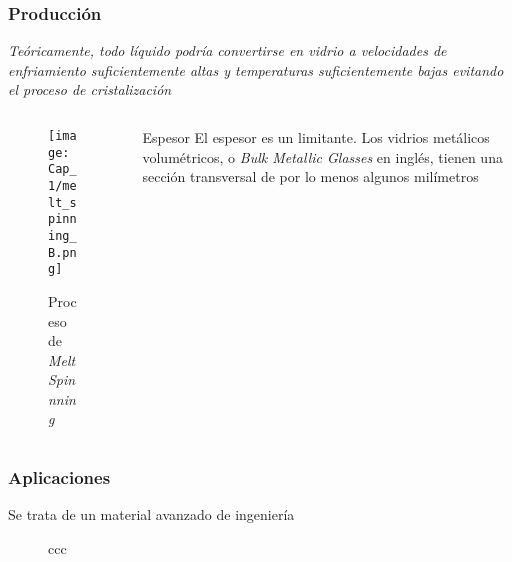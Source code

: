 \begin{frame}
 \frametitle{Producci\'on}
 
 \begin{block}{}
    \textit{Te\'oricamente, todo l\'iquido podr\'ia convertirse en vidrio a velocidades de enfriamiento suficientemente altas y temperaturas suficientemente bajas evitando el proceso de cristalizaci\'on} \cite{turnbull61}
 \end{block}
 
 \begin{columns}
  \begin{column}{5cm}
    \begin{figure}
      \texttt{[image: Cap\_1/melt\_spinning\_B.png]}
      \caption{Proceso de \textit{Melt Spinnning}}
    \end{figure} 
  \end{column}
  \begin{column}{0.5\paperwidth}
   \begin{alertblock}{Espesor}
      El espesor es un limitante. Los vidrios met\'alicos volum\'etricos, o \textit{Bulk Metallic Glasses} en ingl\'es, tienen una secci\'on transversal de por lo menos algunos mil\'imetros
   \end{alertblock}
  \end{column}
 \end{columns}
 
\end{frame}


\begin{frame}
 \frametitle{Aplicaciones}
 \centering
 Se trata de un material avanzado de ingenier\'ia
 
 
 \begin{figure}
 \centering
 \begin{tabularx}{\textwidth}{ccc}
 \end{tabularx}
\end{figure}
\end{frame}

